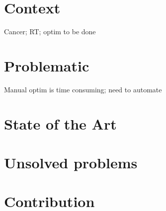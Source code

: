 \section{Context}
Cancer; RT; optim to be done

\section{Problematic}
Manual optim is time consuming; need to automate

\section{State of the Art}

\section{Unsolved problems}

\section{Contribution}
